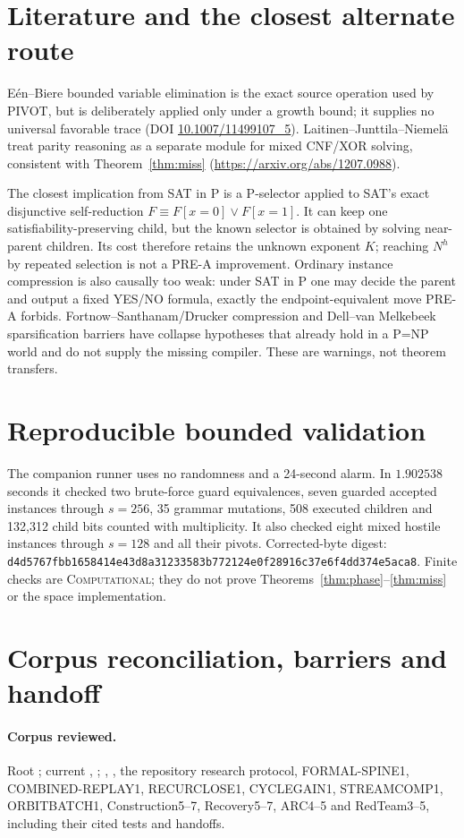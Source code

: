 \documentclass[11pt]{article}
\begin{document}
\section{Literature and the closest alternate route}
E\'en--Biere bounded variable elimination is the exact source operation used
by PIVOT, but is deliberately applied only under a growth bound; it supplies
no universal favorable trace
(DOI \href{https://doi.org/10.1007/11499107_5}{10.1007/11499107\_5}).
Laitinen--Junttila--Niemel\"a treat parity reasoning as a separate module for
mixed CNF/XOR solving, consistent with Theorem~\ref{thm:miss}
(\url{https://arxiv.org/abs/1207.0988}).

The closest implication from SAT in P is a P-selector applied to SAT's exact
disjunctive self-reduction
$F\equiv F[x=0]\vee F[x=1]$.  It can keep one satisfiability-preserving child,
but the known selector is obtained by solving near-parent children.  Its cost
therefore retains the unknown exponent $K$; reaching $N^h$ by repeated
selection is not a PRE-A improvement.  Ordinary instance compression is
also causally too weak: under SAT in P one may decide the parent and output a
fixed YES/NO formula, exactly the endpoint-equivalent move PRE-A forbids.
Fortnow--Santhanam/Drucker compression and Dell--van Melkebeek sparsification
barriers have collapse hypotheses that already hold in a P=NP world and do
not supply the missing compiler.  These are warnings, not theorem transfers.

\section{Reproducible bounded validation}
The companion runner uses no randomness and a 24-second alarm.  In
$1.902538$ seconds it checked two brute-force guard equivalences, seven
guarded accepted instances through $s=256$, 35 grammar mutations, 508
executed children and 132,312 child bits counted with multiplicity.  It also
checked eight mixed hostile instances through $s=128$ and all their pivots.
Corrected-byte digest:
\texttt{d4d5767fbb1658414e43d8a31233583b772124e0f28916c37e6f4dd374e5aca8}.
Finite checks are \textsc{Computational}; they do not prove
Theorems~\ref{thm:phase}--\ref{thm:miss} or the space implementation.

\section{Corpus reconciliation, barriers and handoff}
\paragraph{Corpus reviewed.}
Root ; current , ;
, , the repository research protocol,
FORMAL-SPINE1, COMBINED-REPLAY1, RECURCLOSE1, CYCLEGAIN1, STREAMCOMP1,
ORBITBATCH1, Construction5--7, Recovery5--7, ARC4--5 and RedTeam3--5,
including their cited tests and handoffs.
\end{document}
